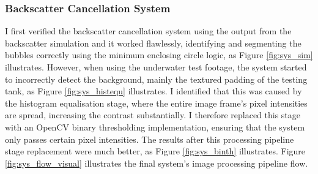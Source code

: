 \subsubsection{Backscatter Cancellation System}
I first verified the backscatter cancellation system using the output from the backscatter simulation and it worked flawlessly, identifying and segmenting the bubbles correctly using the minimum enclosing circle logic, as Figure \ref{fig:sys_sim} illustrates. However, when using the underwater test footage, the system started to incorrectly detect the background, mainly the textured padding of the testing tank, as Figure \ref{fig:sys_histequ} illustrates. I identified that this was caused by the histogram equalisation stage, where the entire image frame's pixel intensities are spread, increasing the contrast substantially. I therefore replaced this stage with an OpenCV binary thresholding implementation, ensuring that the system only passes certain pixel intensities. The results after this processing pipeline stage replacement were much better, as Figure \ref{fig:sys_binth} illustrates. Figure \ref{fig:sys_flow_visual} illustrates the final system's image processing pipeline flow.

